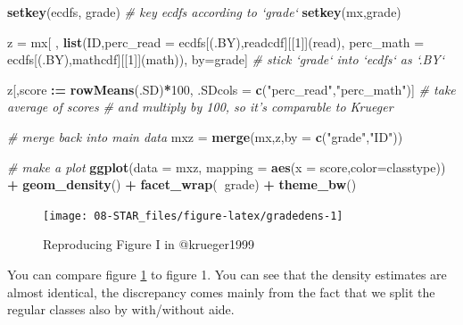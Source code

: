 \documentclass[]{book}
\newenvironment{Shaded}{\begin{snugshade}}{\end{snugshade}}
\newcommand{\KeywordTok}[1]{\textcolor[rgb]{0.13,0.29,0.53}{\textbf{#1}}}
\newcommand{\DataTypeTok}[1]{\textcolor[rgb]{0.13,0.29,0.53}{#1}}
\newcommand{\DecValTok}[1]{\textcolor[rgb]{0.00,0.00,0.81}{#1}}
\newcommand{\StringTok}[1]{\textcolor[rgb]{0.31,0.60,0.02}{#1}}
\newcommand{\CommentTok}[1]{\textcolor[rgb]{0.56,0.35,0.01}{\textit{#1}}}
\newcommand{\OperatorTok}[1]{\textcolor[rgb]{0.81,0.36,0.00}{\textbf{#1}}}
\newcommand{\ErrorTok}[1]{\textcolor[rgb]{0.64,0.00,0.00}{\textbf{#1}}}
\newcommand{\NormalTok}[1]{#1}
\begin{document}
\begin{Shaded}
\begin{Highlighting}[]
\KeywordTok{setkey}\NormalTok{(ecdfs, grade)  }\CommentTok{# key ecdfs according to `grade`}
\KeywordTok{setkey}\NormalTok{(mx,grade)}

\NormalTok{z =}\StringTok{ }\NormalTok{mx[ , }\KeywordTok{list}\NormalTok{(ID,}\DataTypeTok{perc_read =}\NormalTok{ ecdfs[(.BY),readcdf][[}\DecValTok{1}\NormalTok{]](read),}
               \DataTypeTok{perc_math =}\NormalTok{ ecdfs[(.BY),mathcdf][[}\DecValTok{1}\NormalTok{]](math)),}
\NormalTok{        by=grade]   }\CommentTok{# stick `grade` into `ecdfs` as `.BY`}

\NormalTok{z[,score }\OperatorTok{:}\ErrorTok{=}\StringTok{ }\KeywordTok{rowMeans}\NormalTok{(.SD)}\OperatorTok{*}\DecValTok{100}\NormalTok{, .SDcols =}\StringTok{ }\KeywordTok{c}\NormalTok{(}\StringTok{"perc_read"}\NormalTok{,}\StringTok{"perc_math"}\NormalTok{)]  }\CommentTok{# take average of scores}
\CommentTok{# and multiply by 100, so it's comparable to Krueger}

\CommentTok{# merge back into main data}
\NormalTok{mxz =}\StringTok{ }\KeywordTok{merge}\NormalTok{(mx,z,}\DataTypeTok{by =} \KeywordTok{c}\NormalTok{(}\StringTok{"grade"}\NormalTok{,}\StringTok{"ID"}\NormalTok{))}

\CommentTok{# make a plot}
\KeywordTok{ggplot}\NormalTok{(}\DataTypeTok{data =}\NormalTok{ mxz, }\DataTypeTok{mapping =} \KeywordTok{aes}\NormalTok{(}\DataTypeTok{x =}\NormalTok{ score,}\DataTypeTok{color=}\NormalTok{classtype)) }\OperatorTok{+}\StringTok{ }\KeywordTok{geom_density}\NormalTok{() }\OperatorTok{+}\StringTok{ }\KeywordTok{facet_wrap}\NormalTok{(}\OperatorTok{~}\NormalTok{grade) }\OperatorTok{+}\StringTok{ }\KeywordTok{theme_bw}\NormalTok{()}
\end{Highlighting}
\end{Shaded}

\begin{figure}

{\centering \texttt{[image: 08-STAR\_files/figure-latex/gradedens-1]} 

}

\caption{Reproducing Figure I in @krueger1999}\label{fig:gradedens}
\end{figure}

You can compare figure \ref{fig:gradedens} to \citet{krueger1999} figure
1. You can see that the density estimates are almost identical, the
discrepancy comes mainly from the fact that we split the regular classes
also by with/without aide.
\end{document}
